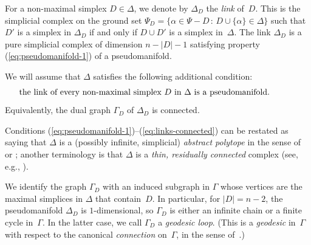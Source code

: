 \documentclass[letterpaper]{amsart}
\numberwithin{equation}{section}
\theoremstyle{definition}
\begin{document}
For a non-maximal simplex $D \in \Delta$, we denote by $\Delta_D$ the 
\emph{link} of~$D$. 
This is the simplicial complex on the ground set 
$\Psi_D = \{\alpha \in \Psi - D \, : \, D \cup \{\alpha\} \in \Delta\}$ 
such that $D'$ is a simplex in $\Delta_D$  if and only if 
$D \cup D'$ is a simplex in~$\Delta$. 
The link $\Delta_D$ is a pure simplicial complex of dimension 
$n-|D|-1$ satisfying property (\ref{eq:pseudomanifold-1}) 
of a pseudomanifold. 
 
We will assume that $\Delta$ satisfies the following additional condition: 
\begin{align} 
\label{eq:links-connected} 
&\text{the link of every non-maximal simplex $D$ in $\Delta$ is a 
pseudomanifold.} \hspace{.3in} 
\end{align} 
Equivalently, the dual graph $\Gamma_D$ of $\Delta_D$ is 
connected. 
 
Conditions (\ref{eq:pseudomanifold-1})--(\ref{eq:links-connected}) 
can be restated as saying that $\Delta$ is a (possibly infinite, simplicial) 
\emph{abstract polytope} in the sense of \cite{adler} or 
\cite{mcmullen-schulte}; 
another terminology is that $\Delta$ is a \emph{thin, residually connected} 
complex (see, e.g., \cite{aschbacher}). 
 
We identify %
the graph $\Gamma_D$ with an induced subgraph in $\Gamma$ whose 
vertices are the maximal simplices in $\Delta$ that contain~$D$. 
In particular, for $|D| = n-2$, the pseudomanifold $\Delta_D$ is $1$-dimensional, so 
$\Gamma_D$ is either an infinite chain or a finite cycle in~$\Gamma$. 
In the latter case, we call $\Gamma_D$  a \emph{geodesic loop}. 
(This is a \emph{geodesic} in~$\Gamma$ with respect to the canonical 
\emph{connection} on~$\Gamma$, in the sense of~\cite{bgh, guillemin-zara}.) 
 
\end{document}
